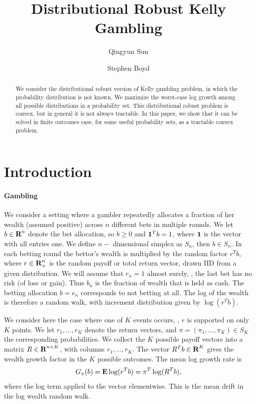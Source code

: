 \documentclass[12pt]{article}
\title{Distributional Robust Kelly Gambling}
\author{Qingyun Sun \and Stephen Boyd}
\date{}
\begin{document}
\maketitle
\begin{abstract}
We consider the distributional robust version of Kelly gambling problem, in which the probability distribution is not known. 
We maximize the worst-case log growth among all possible distributions in a probability set.
This distributional robust problem is convex, but in general it is not always tractable. In this paper, we show that it
can be solved in finite outcomes case, for some useful probability sets, 
as a tractable convex problem.
\end{abstract}
% 
%
\section{Introduction}
\paragraph{Gambling}
We consider a setting where a
gambler repeatedly allocates a fraction of her wealth 
(assumed positive) across $n$ different bets in multiple rounds.
We let $b \in {\mbox{\bf R}}^n$ denote the bet allocation, so 
$b \geq 0$ and $\mathbf 1^Tb=1$, where $\mathbf 1$ is the vector with all
entries one. We define $n-$ dimensional simplex as $S_n$, then $b\in S_n$.
In each betting round the bettor's
wealth is multiplied by the random factor $r^T b$, where $r \in {\mbox{\bf R}}_+^n$
is the random payoff or total return vector,
drawn IID from a given distribution.
We will assume that $r_n =1$ almost surely, \ie, the last bet
has no risk (of loss or gain).  Thus $b_n$ is the fraction of 
wealth that is held as cash.
The betting allocation $b=e_n$ corresponds to not betting at all.
The log of the wealth is therefore a random walk, with 
increment distribution given by $\log(r^Tb)$.

We consider here the case where one of $K$ events occurs, \ie, $r$ is supported
on only $K$ points.  We let $r_1, \ldots, r_K$ denote the 
return vectors, and $\pi = (\pi_1, \ldots, \pi_K)\in S_K$ the corresponding
probabilities.
We collect the $K$ possible payoff vectors into a 
matrix $R\in {\mbox{\bf R}}^{n\times K}$, with columns $r_1, \ldots, r_K$.
The vector $R^Tb \in {\mbox{\bf R}}^K$ gives the wealth growth factor in
the $K$ possible outcomes.
The mean log growth rate is
\[
G_\pi(b) = \mathbf{E} \log (r^Tb) = \pi^T \log (R^Tb),
\]
where the log term applied to the vector elementwise.
This is the mean drift in the log wealth random walk.
\end{document}
